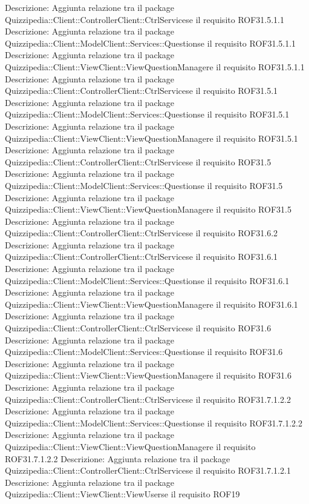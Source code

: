 Descrizione: Aggiunta relazione tra il package Quizzipedia::Client::ControllerClient::CtrlServicese il requisito ROF31.5.1.1 
Descrizione: Aggiunta relazione tra il package Quizzipedia::Client::ModelClient::Services::Questionse il requisito ROF31.5.1.1 
Descrizione: Aggiunta relazione tra il package Quizzipedia::Client::ViewClient::ViewQuestionManagere il requisito ROF31.5.1.1 
Descrizione: Aggiunta relazione tra il package Quizzipedia::Client::ControllerClient::CtrlServicese il requisito ROF31.5.1 
Descrizione: Aggiunta relazione tra il package Quizzipedia::Client::ModelClient::Services::Questionse il requisito ROF31.5.1 
Descrizione: Aggiunta relazione tra il package Quizzipedia::Client::ViewClient::ViewQuestionManagere il requisito ROF31.5.1 
Descrizione: Aggiunta relazione tra il package Quizzipedia::Client::ControllerClient::CtrlServicese il requisito ROF31.5 
Descrizione: Aggiunta relazione tra il package Quizzipedia::Client::ModelClient::Services::Questionse il requisito ROF31.5 
Descrizione: Aggiunta relazione tra il package Quizzipedia::Client::ViewClient::ViewQuestionManagere il requisito ROF31.5 
Descrizione: Aggiunta relazione tra il package Quizzipedia::Client::ControllerClient::CtrlServicese il requisito ROF31.6.2 
Descrizione: Aggiunta relazione tra il package Quizzipedia::Client::ControllerClient::CtrlServicese il requisito ROF31.6.1 
Descrizione: Aggiunta relazione tra il package Quizzipedia::Client::ModelClient::Services::Questionse il requisito ROF31.6.1 
Descrizione: Aggiunta relazione tra il package Quizzipedia::Client::ViewClient::ViewQuestionManagere il requisito ROF31.6.1 
Descrizione: Aggiunta relazione tra il package Quizzipedia::Client::ControllerClient::CtrlServicese il requisito ROF31.6 
Descrizione: Aggiunta relazione tra il package Quizzipedia::Client::ModelClient::Services::Questionse il requisito ROF31.6 
Descrizione: Aggiunta relazione tra il package Quizzipedia::Client::ViewClient::ViewQuestionManagere il requisito ROF31.6 
Descrizione: Aggiunta relazione tra il package Quizzipedia::Client::ControllerClient::CtrlServicese il requisito ROF31.7.1.2.2 
Descrizione: Aggiunta relazione tra il package Quizzipedia::Client::ModelClient::Services::Questionse il requisito ROF31.7.1.2.2 
Descrizione: Aggiunta relazione tra il package Quizzipedia::Client::ViewClient::ViewQuestionManagere il requisito ROF31.7.1.2.2 
Descrizione: Aggiunta relazione tra il package Quizzipedia::Client::ControllerClient::CtrlServicese il requisito ROF31.7.1.2.1 
Descrizione: Aggiunta relazione tra il package Quizzipedia::Client::ViewClient::ViewUserse il requisito ROF19 
